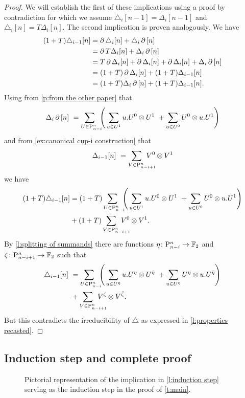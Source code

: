 \begin{proof}
	We will establish the first of these implications using a proof by contradiction for which we assume $\triangle_i [n-1] = \Delta_i [n-1]$ and $\triangle_i [n] = T \Delta_i [n]$.
	The second implication is proven analogously.
	We have
	\begin{align*}
	(1+T) \triangle_{i-1}[n] &=
	\operatorname{\partial} \triangle_i [n] + \triangle_i \operatorname{\partial} \, [n] \\ &=
	\operatorname{\partial} T \Delta_i [n] + \Delta_i \operatorname{\partial} \, [n] \\ &=
	T \operatorname{\partial} \Delta_i [n] + \operatorname{\partial} \Delta_i [n] + \operatorname{\partial} \Delta_i [n] + \Delta_i \operatorname{\partial} \, [n] \\ &=
	(1+T) \operatorname{\partial} \Delta_i [n] + (1+T) \Delta_{i-1} [n] \\ &=
	(1+T) \Delta_i \operatorname{\partial} \, [n] + (1+T) \Delta_{i-1} [n].
	\end{align*}
	Using from \cref{p:from the other paper} that
	\[
	\Delta_i \operatorname{\partial} \, [n] \ =
	\sum_{U \in \mathrm{P}_{n-i}^n \kern-5pt} \left( \,
	\sum_{u \in U^1} {u.U^0} \otimes {U^1} \ +
	\sum_{u \in U^0} {U^0} \otimes {u.U^1} \right)
	\]
	and from \cref{ex:canonical cup-i construction} that
	\[
	\Delta_{i-1} [n] \ =
	\sum_{V \in \P_{n-i+1}^n \kern-15pt} V^0 \ot V^1
	\]
	we have
	\begin{align*}
	(1+T) \triangle_{i-1}[n] &=
	(1+T) \sum_{U \in \P_{n-i}^n \kern-5pt} \left( \,
	\sum_{u \in U^1} {u.U^0} \ot {U^1} \ +
	\sum_{u \in U^0} {U^0} \ot {u.U^1} \right) \\ &+
	(1+T) \sum_{V \in \P_{n-i+1}^n \kern-15pt} V^0 \ot V^1.
	\end{align*}
	By \cref{l:splitting of summands} there are functions $\eta \colon \mathrm{P}_{n-i}^n \to {\mathbb{F}_2}$ and $\zeta \colon \mathrm{P}_{n-i+1}^n \to {\mathbb{F}_2}$ such that
	\begin{align*}
	\triangle_{i-1}[n] \ &=
	\sum_{U \in \P_{n-i}^n \kern-5pt} \left( \,
	\sum_{u \in U^\bareta} u.U^\eta \ot U^\bareta \ +
	\sum_{u \in U^\eta} U^\eta \ot u.U^\bareta \right) \\ &+
	\sum_{V \in \P_{n-i+1}^n \kern-15pt} V^\zeta \ot V^\barzeta.
	\end{align*}
	But this contradicts the irreducibility of $\triangle$ as expressed in \cref{l:properties recasted}.
\end{proof}

\subsection{Induction step and complete proof}

\begin{figure}
	\centering
	
	\caption{Pictorial representation of the implication in \cref{l:induction step} serving as the induction step in the proof of \cref{t:main}.}
	\label{f:induction step}
\end{figure}

